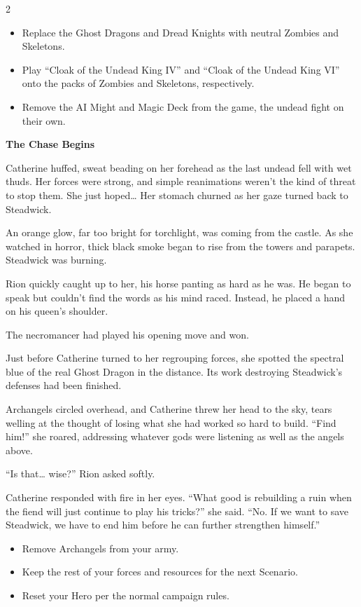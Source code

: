 \begin{multicols*}{2}
\begin{itemize}
  \item \textcolor{darkcandyapplered}{Replace the Ghost Dragons and Dread Knights with  neutral Zombies and Skeletons.}
  \item \textcolor{darkcandyapplered}{Play ``Cloak of the Undead King IV'' and ``Cloak of the Undead King VI'' onto the packs of Zombies and Skeletons, respectively.}
  \item \textcolor{darkcandyapplered}{Remove the AI Might and Magic Deck from the game, the undead fight on their own.}
\end{itemize}


\textbf{The Chase Begins}

Catherine huffed, sweat beading on her forehead as the last undead fell with wet thuds.
Her forces were strong, and simple reanimations weren't the kind of threat to stop them.
She just hoped… Her stomach churned as her gaze turned back to Steadwick.

An orange glow, far too bright for torchlight, was coming from the castle.
As she watched in horror, thick black smoke began to rise from the towers and parapets.
Steadwick was burning.

Rion quickly caught up to her, his horse panting as hard as he was.
He began to speak but couldn't find the words as his mind raced.
Instead, he placed a hand on his queen's shoulder.

The necromancer had played his opening move and won.

Just before Catherine turned to her regrouping forces, she spotted the spectral blue of the real Ghost Dragon in the distance.
Its work destroying Steadwick's defenses had been finished.

Archangels circled overhead, and Catherine threw her head to the sky, tears welling at the thought of losing what she had worked so hard to build.
``Find him!'' she roared, addressing whatever gods were listening as well as the angels above.

``Is that… wise?'' Rion asked softly.

Catherine responded with fire in her eyes.
``What good is rebuilding a ruin when the fiend will just continue to play his tricks?'' she said.
``No.
If we want to save Steadwick, we have to end him before he can further strengthen himself.''

\begin{itemize}
  \item \textcolor{darkcandyapplered}{Remove Archangels from your army.}
  \item \textcolor{darkcandyapplered}{Keep the rest of your forces and resources for the next Scenario.}
  \item \textcolor{darkcandyapplered}{Reset your Hero per the normal campaign rules.}
\end{itemize}

\columnbreak

\begin{center}
\end{center}

\end{multicols*}
